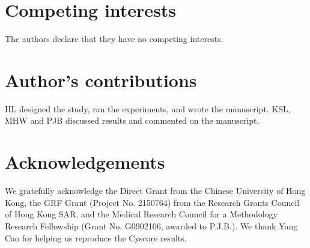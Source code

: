 \documentclass[linenumbers]{bmcart}
\begin{document}
\begin{backmatter}

\section*{Competing interests}
The authors declare that they have no competing interests.

\section*{Author's contributions}
HL designed the study, ran the experiments, and wrote the manuscript. KSL, MHW and PJB discussed results and commented on the manuscript.

\section*{Acknowledgements}
We gratefully acknowledge the Direct Grant from the Chinese University of Hong Kong, the GRF Grant (Project No. 2150764) from the Research Grants Council of Hong Kong SAR, and the Medical Research Council for a Methodology Research Fellowship (Grant No. G0902106, awarded to P.J.B.). We thank Yang Cao for helping us reproduce the Cyscore results.





\end{backmatter}
\end{document}
